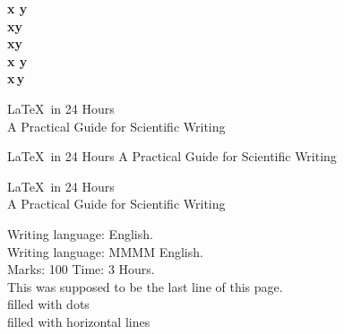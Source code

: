 \documentclass[a4paper]{article}
\begin{document}
	\huge\bfseries
	x y\\
	x\quad y \\
	x\qquad y \\
	
	x y\\
	x\,y \\ %
	
	\newpage
	
	\begin{center}
		\LaTeX\ in 24 Hours\bigskip\\
		A Practical Guide for Scientific Writing 
	\end{center}

	\begin{center}
		\LaTeX\ in 24 Hours\vskip 8mm
		A Practical Guide for Scientific Writing
	\end{center}
	
	\begin{center}
	\LaTeX\ in 24 Hours\vspace{8mm}\\
	A Practical Guide for Scientific Writing 
	\end{center}
	
	Writing language:\hspace{4em} English.\\
	Writing language: MMMM English.\\
	
	Marks: 100 \hfill Time: 3 Hours.\\
	\vfill
	This was supposed to be the last line of this page.\\
	filled with dots \dotfill \\
	filled with horizontal lines\hrulefill
	
\end{document}

